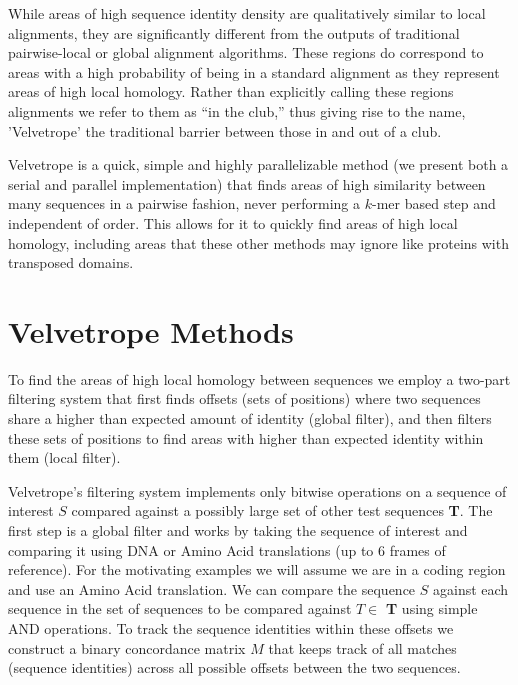 \documentclass[phd,tocprelim]{cornell}
\begin{document}
While areas of high sequence identity density are qualitatively similar to local alignments, they are significantly different from the outputs of traditional pairwise-local or global alignment algorithms. These regions do correspond to areas with a high probability of being in a standard alignment as they represent areas of high local homology. Rather than explicitly calling these regions alignments we refer to them as ``in the club,'' thus giving rise to the name, 'Velvetrope' the traditional barrier between those in and out of a club.

Velvetrope is a quick, simple and highly parallelizable method (we present both a serial and parallel implementation)
that finds areas of high similarity between many
sequences in a pairwise fashion, never performing a $k$-mer based step and independent of order. This allows for it
to quickly find areas of high local homology, including areas that these other
methods may ignore like proteins with transposed domains.


\chapter{Velvetrope Methods} %
\label{cha:Velvetrope Methods}

To find the areas of high local homology between sequences we employ a two-part filtering system that first finds offsets (sets of positions) where two sequences share a higher than expected amount of identity (global filter), and then filters these sets of positions to find areas with higher than expected identity within them (local filter).

Velvetrope's filtering system implements only bitwise operations on a sequence of interest $S$ compared against a possibly large set of other test sequences \textbf{T}. The first step is a global filter and works by taking the sequence of interest and comparing it using DNA or Amino Acid translations (up to 6 frames of reference). For the motivating examples we will assume we are in a coding region and use an Amino Acid translation. We can compare the sequence $S$ against each sequence in the set of sequences to be compared against $T \in$ \textbf{T}  using simple AND operations. To track the sequence identities within these offsets we construct a binary concordance matrix $M$ that keeps track of all matches (sequence identities) across all possible offsets between the two sequences.
\end{document}

